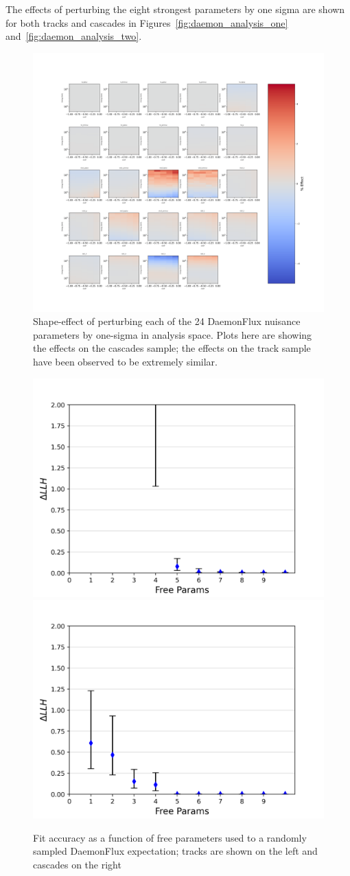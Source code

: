 \documentclass[main.tex]{subfiles}
\begin{document}
The effects of perturbing the eight strongest parameters by one sigma are shown for both tracks and cascades in Figures~\ref{fig:daemon_analysis_one} and~\ref{fig:daemon_analysis_two}.

\begin{figure}
    \centering
    \includegraphics[width=0.9\linewidth]{figures/all_grads.png}
    \caption{Shape-effect of perturbing each of the 24 DaemonFlux nuisance parameters by one-sigma in analysis space. Plots here are showing the effects on the cascades sample; the effects on the track sample have been observed to be extremely similar.}\label{fig:daemon_grads}
\end{figure}

\begin{figure}
    \centering 
    \includegraphics[width=0.45\linewidth]{figures/daemon/results_track.png}%
    \includegraphics[width=0.45\linewidth]{figures/daemon/results.png}
    \caption{Fit accuracy as a function of free parameters used to a randomly sampled DaemonFlux expectation; tracks are shown on the left and cascades on the right}\label{fig:daemon_number}
\end{figure}   
\end{document}
